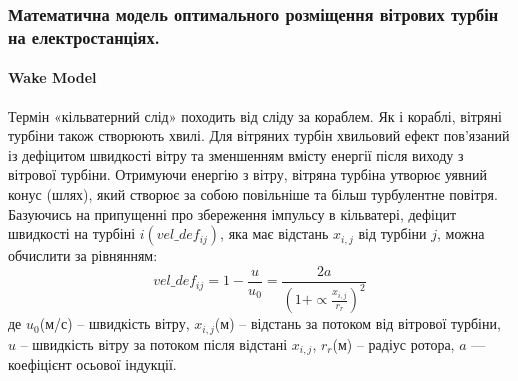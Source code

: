 \documentclass{beamer}
\begin{document}

    \begin{frame}
        \frametitle{Математична модель оптимального розміщення вітрових турбін на електростанціях.}
        \framesubtitle{Wake Model}
        Термін «кільватерний слід» походить від сліду за кораблем. Як і кораблі, вітряні турбіни також створюють хвилі. Для вітряних турбін хвильовий ефект пов’язаний із дефіцитом швидкості 
        вітру та зменшенням вмісту енергії після виходу з вітрової турбіни. Отримуючи енергію з вітру, вітряна турбіна утворює уявний конус (шлях), який створює за собою повільніше та більш 
        турбулентне повітря. Базуючись на припущенні про збереження імпульсу в кільватері, 
        дефіцит швидкості на турбіні $i(vel\_ def_{ij})$, яка має відстань $x_{i,j}$ від турбіни $j$, можна обчислити за рівнянням:
        $$vel\_ def_{ij}=1-\dfrac{u}{u_0}=\dfrac{2a}{(1+\propto\frac{x_{i,j}}{r_r})^2}$$
        де $u_0$(м/с) – швидкість вітру, $x_{i,j}$(м) – відстань за потоком від вітрової турбіни, 
        $u$ – швидкість вітру за потоком після відстані $x_{i,j}$, $r_r$(м) – радіус ротора, $a$ — коефіцієнт осьової індукції.
    \end{frame}
\end{document}
